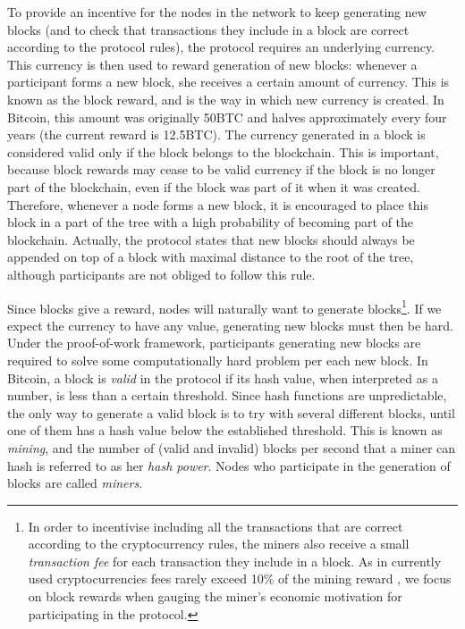 To provide an incentive for the nodes in the network to keep  generating new blocks (and to check that transactions they include in a block are correct according to the protocol rules), the protocol requires an underlying currency. This currency is then used to reward generation of new blocks: whenever a participant forms a new block, she receives a certain amount of currency. This is known as the block reward, and is the way in which new currency is created. In Bitcoin, this amount was originally 50BTC and halves approximately every four years (the current reward is 12.5BTC). The currency generated in a block is considered valid only if the block belongs to the blockchain. This is important, because block rewards may cease to be valid currency if the block is no longer part of the blockchain, even if the block was part of it when it was created. Therefore, whenever a node forms a new block, it is encouraged to place this block in a part of the tree with a high probability of becoming part of the blockchain. Actually, the protocol states that new blocks should always be appended on top of a block with maximal distance to the root of the tree, although participants are not obliged to follow this rule.

Since blocks give a reward, nodes will naturally want to generate blocks\footnote{In order to incentivise including all the transactions that are correct according to the cryptocurrency rules, the miners also receive a small {\em transaction fee} for each transaction they include in a block. As in currently used cryptocurrencies fees rarely exceed 10\% of the mining reward \cite{TotalMiningRevenue,TotalMiningFees}, we focus on block rewards when gauging the miner's economic motivation for participating in the protocol.}. If we expect the currency to have any value, generating new blocks must then be hard. Under the proof-of-work framework, participants generating new blocks are required to solve some computationally hard problem per each new block. In Bitcoin, a block is \emph{valid} in the protocol if its hash value, when interpreted as a number, is less than a certain threshold. Since hash functions are unpredictable, the only way to generate a valid block is to try with several different blocks, until one of them has a hash value below the established threshold. This is known as \emph{mining}, and the number of (valid and invalid) blocks per second that a miner can hash is referred to as her \emph{hash power}. Nodes who participate in the generation of blocks are called \emph{miners}. 


